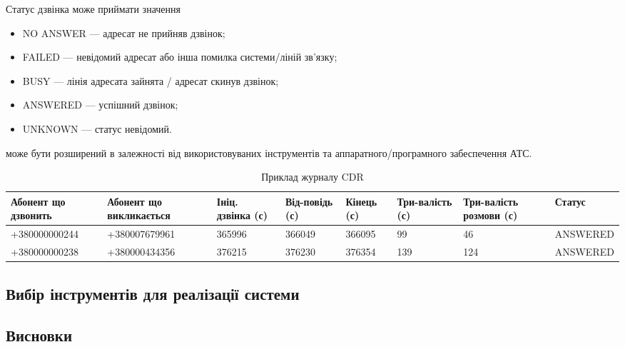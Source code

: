   Статус дзвінка може приймати значення

  \begin{itemize}
    \item NO ANSWER --- адресат не прийняв дзвінок;
    \item FAILED --- невідомий адресат або інша помилка системи/ліній зв'язку;
    \item BUSY --- лінія адресата зайнята / адресат скинув дзвінок;
    \item ANSWERED --- успішний дзвінок;
    \item UNKNOWN --- статус невідомий.
  \end{itemize}

  може бути розширений в залежності від використовуваних інструментів та аппаратного/програмного забеспечення АТС.

  \begin{table}[h]
  \footnotesize
  \caption{Приклад журналу CDR}
        \begin{tabularx}{\textwidth}{| X | X | X | X | X | X | X | X |}
          \hline
          Абонент що дзвонить & Абонент що викликається & Ініц. дзвінка (с) & Від-повідь (с) & Кінець (с) & Три-валість (с) & Три-валість розмови (с) & Статус \\ \hline
          \scriptsize{+380000000244} & \scriptsize{+380007679961} & 365996 & 366049 & 366095 & 99 & 46 & \scriptsize{ANSWERED} \\ \hline
          \scriptsize{+380000000238} & \scriptsize{+380000434356} & 376215 & 376230 & 376354 & 139 & 124 & \scriptsize{ANSWERED}  \\ \hline
      \end{tabularx}
      \label{tab:cdr-log-example}
  \end{table}

\subsubsection{\TBD}

\subsection{Вибір інструментів для реалізації системи}

\newpage
\subsection*{Висновки}
    \TBD
